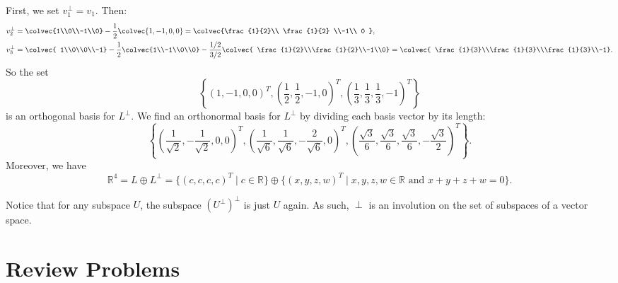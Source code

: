 \begin{example}
First, we set \(v_1^\perp=v_1\). Then:
\begin{align*}
v_2^\perp&=\colvec{1\\0\\-1\\0}-\frac{1}{2}\colvec{1,-1,0,0}
=\colvec{\frac{1}{2}\\ \frac{1}{2} \\-1\\ 0 },\\
v_3^\perp&=\colvec{ 1\\0\\0\\-1} -\frac{1}{2}\colvec{1\\-1\\0\\0}-\frac{1/2}{3/2}
\colvec{ \frac{1}{2}\\\frac{1}{2}\\-1\\0} =\colvec{ \frac{1}{3}\\\frac{1}{3}\\\frac{1}{3}\\-1}.
\end{align*}
So the set \[\left\{ (1,-1,0,0)^T, \left(\frac{1}{2},\frac{1}{2},-1,0\right)^T, \left(\frac{1}{3},\frac{1}{3},\frac{1}{3},-1\right)^T \right\} \] is an orthogonal basis for \(L^\perp\).
We find an orthonormal basis for \(L^\perp\) by dividing each basis vector by its length:
\[
\left\{
\left( \frac{1}{\sqrt{2}}, -\frac{1}{\sqrt{2}},0,0 \right)^T,
\left( \frac{1}{\sqrt{6}}, \frac{1}{\sqrt{6}}, -\frac{2}{\sqrt{6}},0 \right)^T,
\left( \frac{\sqrt{3}}{6}, \frac{\sqrt{3}}{6}, \frac{\sqrt{3}}{6}, -\frac{\sqrt{3}}{2} \right)^T
\right\}.
\]
Moreover, we have
\[
\mathbb{R}^4=L \oplus L^\perp = \{(c,c,c,c)^T \mid c \in \mathbb{R}\} \oplus \{(x,y,z,w)^T \mid x,y,z,w \in \mathbb{R} \text{ and } x+y+z+w=0\}.
\]
\end{example}

Notice that for any subspace $U$, the subspace $(U^\perp)^\perp$ is just $U$ again.  As such, $\perp$ is an involution on the set of subspaces of a vector space.

%

\section{Review Problems}


\newpage


